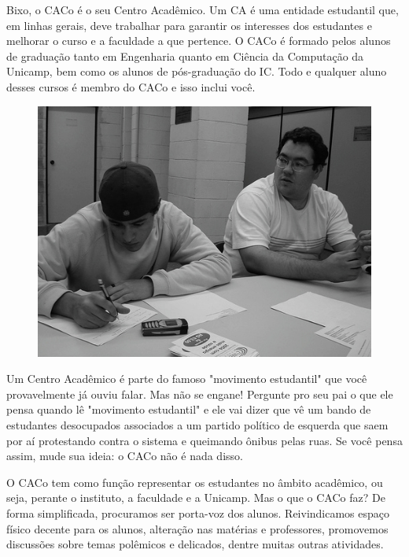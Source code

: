 Bixo, o CACo é o seu Centro Acadêmico. Um CA é uma entidade estudantil que, em
linhas gerais, deve trabalhar para garantir os interesses dos estudantes e
melhorar o curso e a faculdade a que pertence. O CACo é formado pelos alunos
de graduação tanto em Engenharia quanto em Ciência da Computação da Unicamp,
bem como os alunos de pós-graduação do IC. Todo e qualquer aluno desses cursos
é membro do CACo e isso inclui você.

\begin{figure}[h!]
    \vspace{-10pt}
    \centering
    \includegraphics[scale=0.58, keepaspectratio=true]{img/imgs/21-CACo/-123.jpg}
    \vspace{-10pt}
\end{figure}


Um Centro Acadêmico é parte do famoso "movimento estudantil" que você
provavelmente já ouviu falar. Mas não se engane! Pergunte pro seu pai o que ele
pensa quando lê "movimento estudantil" e ele vai dizer que vê um bando de
estudantes desocupados associados a um partido político de esquerda que saem por
aí protestando contra o sistema e queimando ônibus pelas ruas. Se você pensa
assim, mude sua ideia: o CACo não é nada disso.

O CACo tem como função representar os estudantes no âmbito acadêmico, ou seja,
perante o instituto, a faculdade e a Unicamp. Mas o que o CACo faz? De forma
simplificada, procuramos ser porta-voz dos alunos. Reivindicamos espaço físico
decente para os alunos, alteração nas matérias e professores, promovemos
discussões sobre temas polêmicos e delicados, dentre muitas outras atividades.

